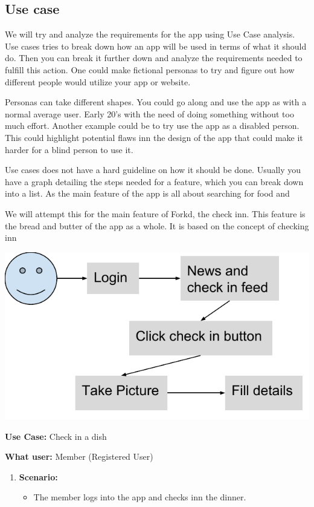 \documentclass[12pt]{article}
\begin{document}
\subsection{Use case}
We will try and analyze the requirements for the app using Use Case
analysis\cite[p.109-113]{usecase}.  Use cases tries to break down how an app will
be used in terms of what it should do. Then you can break it further down and
analyze the requirements needed to fulfill this action. One could make fictional
personas\cite[p.108]{usecase} to try and figure out how different people would
utilize your app or website.

Personas can take different shapes. You could go along and use the app as with a
normal average user. Early 20's with the need of doing something without too
much effort. Another example could be to try use the app as a disabled person.
This could highlight potential flaws inn the design of the app that could make
it harder for a blind person to use it.

Use cases does not have a hard guideline on how it should be done. Usually you
have a graph detailing the steps needed for a feature, which you can break down
into a list. As the main feature of the app is all about searching for food and 

We will attempt this for the main feature of Forkd, the check inn. This feature
is the bread and butter of the app as a whole. It is based on the concept of
checking inn 


\bigbreak
\includegraphics[width=16cm]{pictures/usecasecheckin}
\bigbreak

\textbf{Use Case:} Check in a dish

\textbf{What user:} Member (Registered User)

\begin{enumerate}[leftmargin=-0in]
  \item[] \textbf{Scenario:} 
    \begin{itemize}
      \item The member logs into the app and checks inn the dinner.
    \end{itemize}

\end{enumerate}
\end{document}
